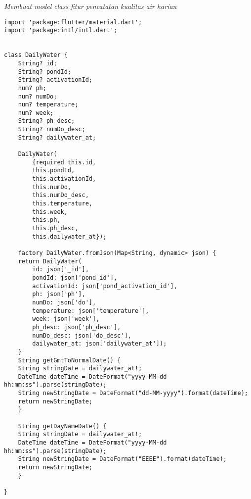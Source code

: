 	\textit{Membuat model class fitur pencatatan kualitas air harian}
	\begin{lstlisting}
import 'package:flutter/material.dart';
import 'package:intl/intl.dart';


class DailyWater {
    String? id;
    String? pondId;
    String? activationId;
    num? ph;
    num? numDo;
    num? temperature;
    num? week;
    String? ph_desc;
    String? numDo_desc;
    String? dailywater_at;

    DailyWater(
        {required this.id,
        this.pondId,
        this.activationId,
        this.numDo,
        this.numDo_desc,
        this.temperature,
        this.week,
        this.ph,
        this.ph_desc,
        this.dailywater_at});

    factory DailyWater.fromJson(Map<String, dynamic> json) {
    return DailyWater(
        id: json['_id'],
        pondId: json['pond_id'],
        activationId: json['pond_activation_id'],
        ph: json['ph'],
        numDo: json['do'],
        temperature: json['temperature'],
        week: json['week'],
        ph_desc: json['ph_desc'],
        numDo_desc: json['do_desc'],
        dailywater_at: json['dailywater_at']);
    }
    String getGmtToNormalDate() {
    String stringDate = dailywater_at!;
    DateTime dateTime = DateFormat("yyyy-MM-dd hh:mm:ss").parse(stringDate);
    String newStringDate = DateFormat("dd-MM-yyyy").format(dateTime);
    return newStringDate;
    }

    String getDayNameDate() {
    String stringDate = dailywater_at!;
    DateTime dateTime = DateFormat("yyyy-MM-dd hh:mm:ss").parse(stringDate);
    String newStringDate = DateFormat("EEEE").format(dateTime);
    return newStringDate;
    }

}
	\end{lstlisting}

